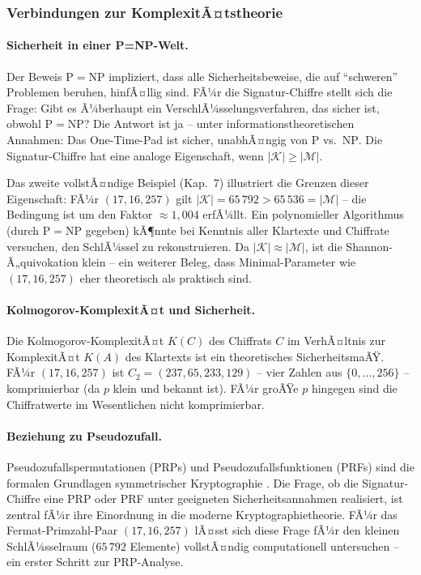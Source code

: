 ﻿\documentclass[a4paper,12pt]{scrreprt}
\theoremstyle{definition}
\begin{document}
\subsubsection{Verbindungen zur KomplexitÃ¤tstheorie}

\paragraph{Sicherheit in einer P=NP-Welt.}
Der Beweis $\mathrm{P}=\mathrm{NP}$ \cite{Epp26a} impliziert, dass alle Sicherheitsbeweise, die auf ``schweren'' Problemen beruhen, hinfÃ¤llig sind. FÃ¼r die Signatur-Chiffre stellt sich die Frage: Gibt es Ã¼berhaupt ein VerschlÃ¼sselungsverfahren, das sicher ist, obwohl $\mathrm{P}=\mathrm{NP}$? Die Antwort ist ja -- unter informationstheoretischen Annahmen: Das One-Time-Pad \cite{Ver26} ist sicher, unabhÃ¤ngig von $\mathrm{P}$ vs.\ $\mathrm{NP}$. Die Signatur-Chiffre hat eine analoge Eigenschaft, wenn $|\mathcal{K}| \geq |\mathcal{M}|$.

Das zweite vollstÃ¤ndige Beispiel (Kap.~7) illustriert die Grenzen dieser Eigenschaft: FÃ¼r $(17, 16, 257)$ gilt $|\mathcal{K}| = 65\,792 > 65\,536 = |\mathcal{M}|$ -- die Bedingung ist um den Faktor $\approx 1{,}004$ erfÃ¼llt. Ein polynomieller Algorithmus (durch $\mathrm{P}=\mathrm{NP}$ gegeben) kÃ¶nnte bei Kenntnis aller Klartexte und Chiffrate versuchen, den SchlÃ¼ssel zu rekonstruieren. Da $|\mathcal{K}| \approx |\mathcal{M}|$, ist die Shannon-Ã„quivokation klein -- ein weiterer Beleg, dass Minimal-Parameter wie $(17, 16, 257)$ eher theoretisch als praktisch sind.

\paragraph{Kolmogorov-KomplexitÃ¤t und Sicherheit.}
Die Kolmogorov-KomplexitÃ¤t $K(C)$ des Chiffrats $C$ im VerhÃ¤ltnis zur KomplexitÃ¤t $K(A)$ des Klartexts ist ein theoretisches SicherheitsmaÃŸ. FÃ¼r $(17, 16, 257)$ ist $C_2 = (237, 65, 233, 129)$ -- vier Zahlen aus $\{0,\ldots,256\}$ -- komprimierbar (da $p$ klein und bekannt ist). FÃ¼r groÃŸe $p$ hingegen sind die Chiffratwerte im Wesentlichen nicht komprimierbar.

\paragraph{Beziehung zu Pseudozufall.}
Pseudozufallspermutationen (PRPs) und Pseudozufallsfunktionen (PRFs) sind die formalen Grundlagen symmetrischer Kryptographie \cite{GM84}. Die Frage, ob die Signatur-Chiffre eine PRP oder PRF unter geeigneten Sicherheitsannahmen realisiert, ist zentral fÃ¼r ihre Einordnung in die moderne Kryptographietheorie. FÃ¼r das Fermat-Primzahl-Paar $(17, 16, 257)$ lÃ¤sst sich diese Frage fÃ¼r den kleinen SchlÃ¼sselraum ($65\,792$ Elemente) vollstÃ¤ndig computationell untersuchen -- ein erster Schritt zur PRP-Analyse.
\end{document}
